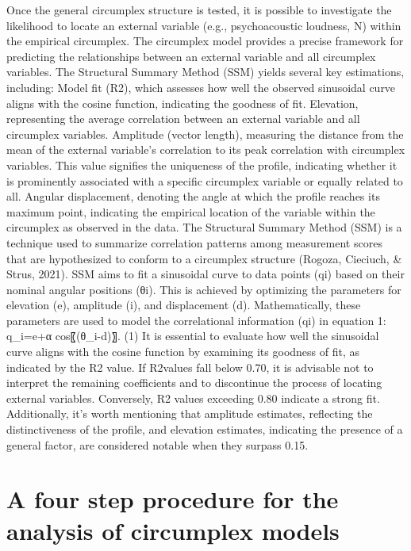 \documentclass[
  authoryear,
  preprint,
  3p]{elsarticle}
\begin{document}
Once the general circumplex structure is tested, it is possible to
investigate the likelihood to locate an external variable (e.g.,
psychoacoustic loudness, N) within the empirical circumplex. The
circumplex model provides a precise framework for predicting the
relationships between an external variable and all circumplex variables.
The Structural Summary Method (SSM) yields several key estimations,
including: Model fit (R2), which assesses how well the observed
sinusoidal curve aligns with the cosine function, indicating the
goodness of fit. Elevation, representing the average correlation between
an external variable and all circumplex variables. Amplitude (vector
length), measuring the distance from the mean of the external variable's
correlation to its peak correlation with circumplex variables. This
value signifies the uniqueness of the profile, indicating whether it is
prominently associated with a specific circumplex variable or equally
related to all. Angular displacement, denoting the angle at which the
profile reaches its maximum point, indicating the empirical location of
the variable within the circumplex as observed in the data. The
Structural Summary Method (SSM) is a technique used to summarize
correlation patterns among measurement scores that are hypothesized to
conform to a circumplex structure (Rogoza, Cieciuch, \& Strus, 2021).
SSM aims to fit a sinusoidal curve to data points (qi) based on their
nominal angular positions (θi). This is achieved by optimizing the
parameters for elevation (e), amplitude (i), and displacement (d).
Mathematically, these parameters are used to model the correlational
information (qi) in equation 1: q\_i=e+α cos⁡〖(θ\_i-d)〗. (1) It is
essential to evaluate how well the sinusoidal curve aligns with the
cosine function by examining its goodness of fit, as indicated by the R2
value. If R2values fall below 0.70, it is advisable not to interpret the
remaining coefficients and to discontinue the process of locating
external variables. Conversely, R2 values exceeding 0.80 indicate a
strong fit. Additionally, it's worth mentioning that amplitude
estimates, reflecting the distinctiveness of the profile, and elevation
estimates, indicating the presence of a general factor, are considered
notable when they surpass 0.15.

\section{A four step procedure for the analysis of circumplex
models}\label{a-four-step-procedure-for-the-analysis-of-circumplex-models}
\end{document}
